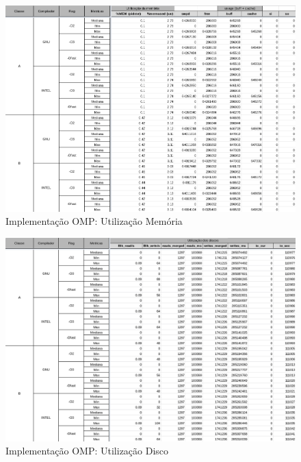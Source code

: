 \documentclass{article}
\begin{document}
\begin{appendices}
\begin{figure}[H]
    \centering
    \includegraphics[width=12cm]{Pictures/LUMZ_r641_OMP_MEM.png}
    \caption{Implementação OMP: Utilização Memória}
    \label{figure:LUMZ_r641_OMP_MEM}
\end{figure}

\begin{figure}[H]
    \centering
    \includegraphics[width=12cm]{Pictures/LUMZ_r641_OMP_DISK.png}
    \caption{Implementação OMP: Utilização Disco}
    \label{figure:LUMZ_r641_OMP_DISK}
\end{figure}


\end{appendices}
\end{document}

